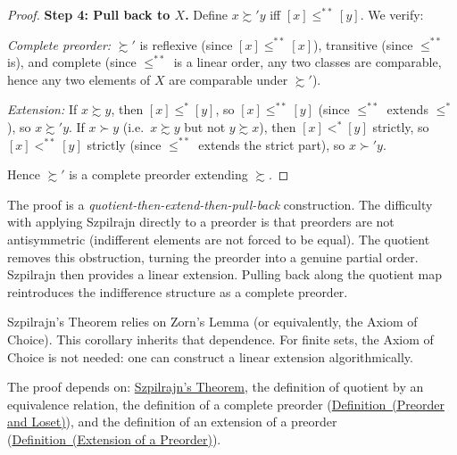 \begin{proof}
\medskip
\noindent\textbf{Step 4: Pull back to $X$.} Define $x \succsim' y$ iff $[x]
\leq^{**} [y]$. We verify:

\textit{Complete preorder:} $\succsim'$ is reflexive (since $[x] \leq^{**}
[x]$), transitive (since $\leq^{**}$ is), and complete (since $\leq^{**}$ is
a linear order, any two classes are comparable, hence any two elements of $X$
are comparable under $\succsim'$).

\textit{Extension:} If $x \succsim y$, then $[x] \leq^* [y]$, so $[x]
\leq^{**} [y]$ (since $\leq^{**}$ extends $\leq^*$), so $x \succsim' y$. If
$x \succ y$ (i.e.\ $x \succsim y$ but not $y \succsim x$), then $[x] <^*
[y]$ strictly, so $[x] <^{**} [y]$ strictly (since $\leq^{**}$ extends the
strict part), so $x \succ' y$.

Hence $\succsim'$ is a complete preorder extending $\succsim$. \AsReq
\end{proof}

\begin{remark*}
The proof is a \emph{quotient-then-extend-then-pull-back} construction. The
difficulty with applying Szpilrajn directly to a preorder is that preorders are
not antisymmetric (indifferent elements are not forced to be equal). The
quotient removes this obstruction, turning the preorder into a genuine partial
order. Szpilrajn then provides a linear extension. Pulling back along the
quotient map reintroduces the indifference structure as a complete preorder.
\end{remark*}

\begin{remark*}
Szpilrajn's Theorem relies on Zorn's Lemma (or equivalently, the Axiom of
Choice). This corollary inherits that dependence. For finite sets, the Axiom
of Choice is not needed: one can construct a linear extension algorithmically.
\end{remark*}

\begin{remark*}[Dependencies]
The proof depends on: \hyperref[thm:szpilrajn]{Szpilrajn's Theorem}, the
definition of quotient by an equivalence relation, the definition of a complete
preorder (\hyperref[def:preorder-ext]{Definition~(Preorder and Loset)}), and
the definition of an extension of a preorder
(\hyperref[def:preorder-extension]{Definition~(Extension of a Preorder)}).
\end{remark*}
